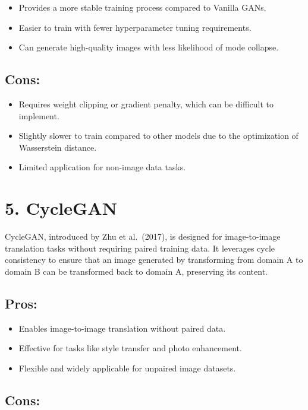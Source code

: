 \documentclass[
]{book}
\providecommand{\tightlist}{%
  \setlength{\itemsep}{0pt}\setlength{\parskip}{0pt}}
\begin{document}
\begin{itemize}
\tightlist
\item
  Provides a more stable training process compared to Vanilla GANs.
\item
  Easier to train with fewer hyperparameter tuning requirements.
\item
  Can generate high-quality images with less likelihood of mode collapse.
\end{itemize}

\subsection{Cons:}\label{cons-3}

\begin{itemize}
\tightlist
\item
  Requires weight clipping or gradient penalty, which can be difficult to implement.
\item
  Slightly slower to train compared to other models due to the optimization of Wasserstein distance.
\item
  Limited application for non-image data tasks.
\end{itemize}

\section{5. CycleGAN}\label{cyclegan}

CycleGAN, introduced by Zhu et al.~(2017), is designed for image-to-image translation tasks without requiring paired training data. It leverages cycle consistency to ensure that an image generated by transforming from domain A to domain B can be transformed back to domain A, preserving its content.

\subsection{Pros:}\label{pros-4}

\begin{itemize}
\tightlist
\item
  Enables image-to-image translation without paired data.
\item
  Effective for tasks like style transfer and photo enhancement.
\item
  Flexible and widely applicable for unpaired image datasets.
\end{itemize}

\subsection{Cons:}\label{cons-4}
\end{document}

